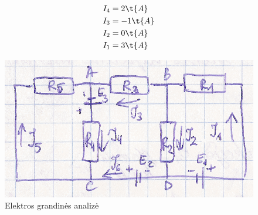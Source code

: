 \begin{exmp}
  \begin{align*}
    I_{4} &= 2 \t{A} \\
    I_{3} &= -1 \t{A} \\
    I_{2} &= 0 \t{A} \\
    I_{1} &= 3 \t{A}
  \end{align*}
\end{exmp}

\begin{figure}[H]
  \begin{center}
    \includegraphics[height=0.5\textwidth]{images/grandine3.png}
  \end{center}
  \caption{Elektros grandinės analizė}
  \label{fig:grandine3}
\end{figure}

